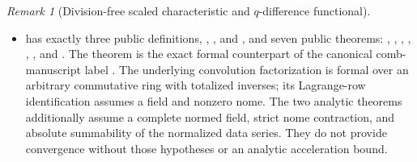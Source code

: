 \documentclass[11pt,oneside]{article}
\theoremstyle{definition}
\theoremstyle{remark}
\newtheorem{remark}[remark]{Remark}
\begin{document}
\begin{remark}[Division-free scaled characteristic and \(q\)-difference functional]
\begin{itemize}
\item {} has exactly three public
definitions,
,
, and
, and seven public theorems:
,
,
,
,
,
, and
.
The theorem  is the exact
formal counterpart of the canonical comb-manuscript label
.  The underlying convolution factorization
is formal over an arbitrary commutative ring with totalized inverses; its
Lagrange-row identification assumes a field and nonzero nome.  The two
analytic  theorems additionally assume a complete normed field,
strict nome contraction, and absolute summability of the normalized data
series.  They do not provide convergence without those hypotheses or an
analytic acceleration bound.


\end{itemize}
\end{remark}
\end{document}
